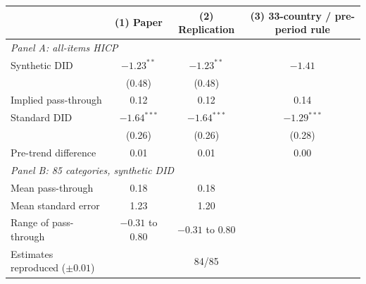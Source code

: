 \begin{tabular}{lccc}
\toprule
 & (1) Paper & (2) Replication & (3) 33-country / pre-period rule \\
\midrule
\multicolumn{4}{l}{\textit{Panel A: all-items HICP}} \\
Synthetic DID & $-1.23^{**}$ & $-1.23^{**}$ & $-1.41$ \\
 & (0.48) & (0.48) & \\
Implied pass-through & 0.12 & 0.12 & 0.14 \\
Standard DID & $-1.64^{***}$ & $-1.64^{***}$ & $-1.29^{***}$ \\
 & (0.26) & (0.26) & (0.28) \\
Pre-trend difference & 0.01 & 0.01 & 0.00 \\
\midrule
\multicolumn{4}{l}{\textit{Panel B: 85 categories, synthetic DID}} \\
Mean pass-through & 0.18 & 0.18 & \\
Mean standard error & 1.23 & 1.20 & \\
Range of pass-through & $-0.31$ to $0.80$ & $-0.31$ to $0.80$ & \\
Estimates reproduced ($\pm 0.01$) & & 84/85 & \\
\bottomrule
\end{tabular}
